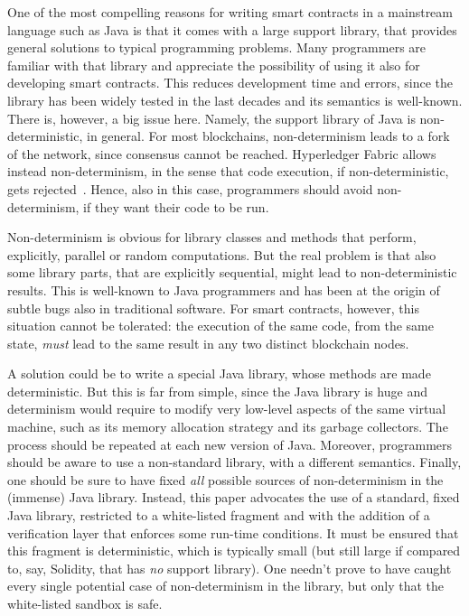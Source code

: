 One of the most compelling reasons for writing smart contracts
in a mainstream language such as Java is that it comes with a large
support library, that provides general solutions to typical programming problems.
Many programmers are familiar with that library and appreciate the possibility
of using it also for developing smart contracts. This reduces
development time and errors, since the library has been widely tested
in the last decades and its semantics is well-known. There is, however, a big
issue here. Namely, the support library of Java is non-deterministic, in general.
For most blockchains, non-determinism leads to a fork of the network, since
consensus cannot be reached. Hyperledger Fabric allows instead non-determinism,
in the sense that code execution, if non-deterministic, gets rejected~\cite{Vukolic17}.
Hence, also in this case, programmers should avoid non-determinism, if they want their code to be run.

Non-determinism is obvious for library classes and methods that perform, explicitly,
parallel or random computations. But the real problem is that
also some library parts, that are explicitly sequential, might lead to
non-deterministic results.
This is well-known to Java programmers and has been at the origin of subtle
bugs also in traditional software. For smart contracts, however,
this situation cannot be tolerated: the execution of the same code, from the same state,
\emph{must} lead to the same result in any two distinct blockchain nodes.

A solution could be to write a special Java library, whose
methods are made deterministic. But this is far from simple, since the Java library is huge
and determinism would require to modify very low-level aspects of the same virtual machine, such as
its memory allocation strategy and its garbage collectors.
The process should be repeated at each new version of Java.
Moreover, programmers should be aware to use a non-standard library, with a different semantics.
Finally, one should be sure to have fixed \emph{all} possible sources of non-determinism in the
(immense) Java library.
Instead, this paper advocates the use of a standard, fixed Java library, restricted to a white-listed
fragment and with the addition of a verification layer that enforces some run-time conditions.
It must be ensured that this fragment is deterministic, which is typically small (but still
large if compared to, say, Solidity, that has \emph{no} support library). One needn't prove
to have caught every single potential case of non-determinism in the library, but only that
the white-listed sandbox is safe.

